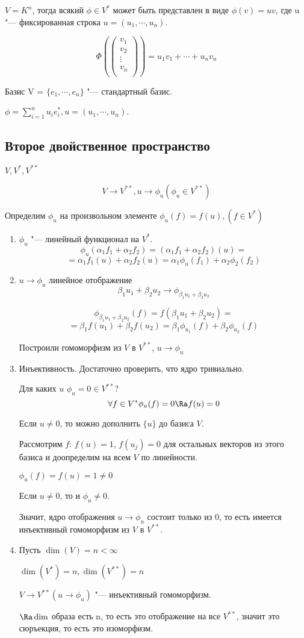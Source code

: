 \begin{Rem}
$V = K^n$, тогда всякий $\phi \in V^{*}$ 
может быть представлен в виде $\phi(v) = uv$, где 
u "--- фиксированная строка $u = (u_1, \cdots, u_n)$.

$$
\Phi(\begin{pmatrix}
v_1\\
v_2\\
\vdots\\
v_n\\
\end{pmatrix}) = u_1v_1 + \cdots + u_nv_n
$$

Базис V = $\{e_1, \cdots, e_n\}$ "--- стандартный базис.

$\phi = \sum_{i = 1}^{n}u_ie_i^{*}, u = (u_1, \cdots, u_n)$.
\end{Rem}

\subsection{Второе двойственное пространство}
$V, V^*, V^{**}$

$$V \to V^{**}, u \to \phi_u (\phi_u \in V^{**})$$

Определим $\phi_u$ на произвольном элементе $\phi_u(f) = f(u), (f \in V^*)$

\begin{enumerate}
\item $\phi_u$ "--- линейный функционал на $V^*$.
$$\phi_u(\alpha_1f_1 + \alpha_2f_2) = (\alpha_1f_1 + \alpha_2f_2)(u) = $$
$$= \alpha_1f_1(u) + \alpha_2f_2(u) = \alpha_1\phi_u(f_1) + \alpha_2\phi_2(f_2)$$
\item $u \to \phi_u$ линейное отображение
$$\beta_1u_1 + \beta_2u_2 \to \phi_{\beta_1u_1 + \beta_2u_2}$$

$$\phi_{\beta_1u_1 + \beta_2u_2}(f) = f(\beta_1u_1 + \beta_2u_2) = $$
$$= \beta_1f(u_1) + \beta_2f(u_2) = \beta_1 \phi_{u_1}(f) + \beta_2\phi_{u_2}(f)$$

Построили гомоморфизм из $V$  в $V^{**}$, $u \to \phi_u$
\item Инъективность. Достаточно проверить, что ядро тривиально. 

Для каких $u$ $\phi_u = 0 \in V^{**}$?
$$\forall f \in V^* \phi_u(f) = 0 \Ra f(u) = 0 $$

Если $u \ne 0$, то можно дополнить $\{u\}$ до базиса $V$.

Рассмотрим $f$: $f(u) = 1$, $f(u_j) = 0$ для остальных
векторов из этого базиса и доопределим на всем $V$ по линейности.

$\phi_u(f) = f(u) = 1 \ne 0$

Если $u \ne 0$, то и $\phi_u \ne 0$.

Значит, ядро отображения $u \to \phi_u$ состоит только из 0, 
то есть имеется инъективный гомоморфизм из $V$ в $V^{**}$.
\item Пусть $\dim(V) = n < \infty$

$\dim(V^{*}) = n, \dim(V^{**}) = n$

$V \to V^{**}(u \to \phi_u)$ "--- инъективный гомоморфизм.

$\Ra \dim$ образа есть n,  то есть это отображение на все $V^{**}$,
значит это сюръекция, то есть это изоморфизм.  
\end{enumerate}


